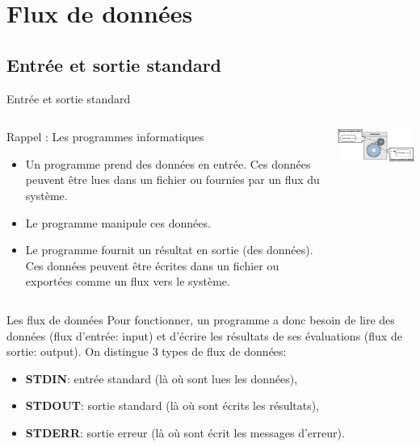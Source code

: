 \section{Flux de données}
\subsection{Entrée et sortie standard}
\begin{frame}{Entrée et sortie standard}
  \begin{columns}
    \begin{column}{6cm}
      \begin{block}{Rappel : Les programmes informatiques}
        \begin{itemize}
        \item Un programme prend des données en entrée. Ces données
          peuvent être lues dans un fichier ou fournies par un flux du
          système.
        \item Le programme manipule ces données.
        \item Le programme fournit un résultat en sortie (des
          données). Ces données peuvent être écrites dans un fichier ou
          exportées comme un flux vers le système.
        \end{itemize}
      \end{block}
    \end{column}
    \begin{column}{6cm}
      \includegraphics[width=6cm]{img/s05/stdin_stdout_commande_1.jpg}
    \end{column}
  \end{columns}
  \begin{block}{Les flux de données}
    Pour fonctionner, un programme a donc besoin de lire des données
    (flux d'entrée: input) et d'écrire les résultats de ses évaluations
    (flux de sortie: output). On distingue 3 types de flux de données:
    \begin{itemize}
    \item \textbf{STDIN}: entrée standard (là où sont lues les données),
    \item \textbf{STDOUT}: sortie standard (là où sont écrits les
      résultats),
    \item \textbf{STDERR}: sortie erreur (là où sont écrit les messages
      d'erreur).
    \end{itemize}
  \end{block}
\end{frame}
